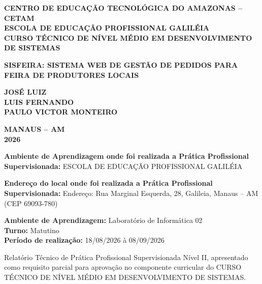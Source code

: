 \documentclass[12pt,a4paper]{article}
\newcommand{\varInstituicao}{CENTRO DE EDUCAÇÃO TECNOLÓGICA DO AMAZONAS -- CETAM}
\newcommand{\varEscola}{ESCOLA DE EDUCAÇÃO PROFISSIONAL GALILÉIA}
\newcommand{\varCurso}{CURSO TÉCNICO DE NÍVEL MÉDIO EM DESENVOLVIMENTO DE SISTEMAS}
\newcommand{\varTitulo}{SISFEIRA: SISTEMA WEB DE GESTÃO DE PEDIDOS PARA FEIRA DE PRODUTORES LOCAIS}
\newcommand{\varEstudanteUm}{José Luiz}
\newcommand{\varEstudanteDois}{Luis Fernando}
\newcommand{\varEstudanteTres}{Paulo Victor Monteiro}
\newcommand{\varEnderecoPratica}{Endereço: Rua Marginal Esquerda, 28, Galileia, Manaus -- AM (CEP 69093-780)}
\newcommand{\varAmbientePratica}{Laboratório de Informática 02}
\newcommand{\varTurno}{Matutino}
\newcommand{\varPeriodo}{18/08/2026 à 08/09/2026}
\newcommand{\varMunicipio}{MANAUS -- AM}
\newcommand{\varAno}{2026}
\begin{document}
\thispagestyle{empty}
\begin{center}
    {\bfseries\MakeUppercase{\varInstituicao}}\\[0.2cm]
    {\bfseries\MakeUppercase{\varEscola}}\\[0.2cm]
    {\bfseries\MakeUppercase{\varCurso}}
    
    \vspace*{\fill}
    
    {\bfseries\MakeUppercase{\varTitulo}}
    
    \vspace{1.5cm}
    
    {\bfseries\MakeUppercase{\varEstudanteUm}}\\[0.15cm]
    {\bfseries\MakeUppercase{\varEstudanteDois}}\\[0.15cm]
    {\bfseries\MakeUppercase{\varEstudanteTres}}
    
    \vspace*{\fill}
    
    {\bfseries\varMunicipio}\\[0.1cm]
    {\bfseries\varAno}
\end{center}
\newpage

\thispagestyle{empty}
\noindent \textbf{Ambiente de Aprendizagem onde foi realizada a Prática Profissional Supervisionada:} \varEscola

\vspace{0.4cm}
\noindent \textbf{Endereço do local onde foi realizada a Prática Profissional Supervisionada:} \varEnderecoPratica

\vspace{0.4cm}
\noindent \textbf{Ambiente de Aprendizagem:} \varAmbientePratica\\
\textbf{Turno:} \varTurno\\
\textbf{Período de realização:} \varPeriodo

\vspace{0.8cm}
\noindent Relatório Técnico de Prática Profissional Supervisionada Nível II, apresentado como requisito parcial para aprovação no componente curricular do \varCurso.
\end{document}
